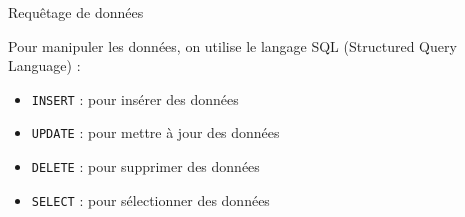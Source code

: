 \begin{frame}{Requêtage de données}

    Pour manipuler les données, on utilise le langage SQL (Structured Query
    Language) :

    \begin{itemize}
        \item \texttt{INSERT} : pour insérer des données
        \item \texttt{UPDATE} : pour mettre à jour des données
        \item \texttt{DELETE} : pour supprimer des données
        \item \texttt{SELECT} : pour sélectionner des données
    \end{itemize}

\end{frame}
